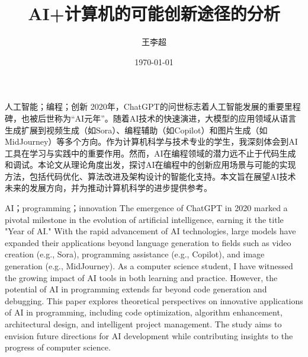 \documentclass[supercite]{HustGraduPaper}
\title{AI+计算机的可能创新途径的分析} %
\author{王李超} %
\date{\today} %
\begin{document}
	\maketitle[line length=16em]
	
	
	\clearpage %
	
	\begin{cnabstract}{人工智能；编程；创新}
		2020年，ChatGPT的问世标志着人工智能发展的重要里程碑，也被后世称为“AI元年”。随着AI技术的快速演进，大模型的应用领域从语言生成扩展到视频生成（如Sora）、编程辅助（如Copilot）和图片生成（如MidJourney）等多个方向。作为计算机科学与技术专业的学生，我深刻体会到AI工具在学习与实践中的重要作用。然而，AI在编程领域的潜力远不止于代码生成和调试。本论文从理论角度出发，探讨AI在编程中的创新应用场景与可能的实现方法，包括代码优化、算法改进及架构设计的智能化支持。本文旨在展望AI技术未来的发展方向，并为推动计算机科学的进步提供参考。
	\end{cnabstract}
	\begin{enabstract}{AI；programming；innovation}
		The emergence of ChatGPT in 2020 marked a pivotal milestone in the evolution of artificial intelligence, earning it the title "Year of AI." With the rapid advancement of AI technologies, large models have expanded their applications beyond language generation to fields such as video creation (e.g., Sora), programming assistance (e.g., Copilot), and image generation (e.g., MidJourney). As a computer science student, I have witnessed the growing impact of AI tools in both learning and practice. However, the potential of AI in programming extends far beyond code generation and debugging. This paper explores theoretical perspectives on innovative applications of AI in programming, including code optimization, algorithm enhancement, architectural design, and intelligent project management. The study aims to envision future directions for AI development while contributing insights to the progress of computer science.
	\end{enabstract}
	
\end{document}
